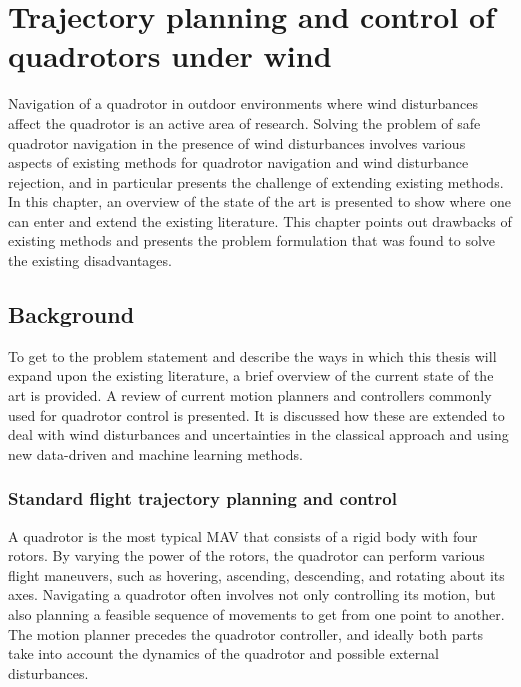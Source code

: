 \chapter{Trajectory planning and control of quadrotors under wind}

Navigation of a quadrotor in outdoor environments where wind disturbances affect the quadrotor is an active area of research. Solving the problem of safe quadrotor navigation in the presence of wind disturbances involves various aspects of existing methods for quadrotor navigation and wind disturbance rejection, and in particular presents the challenge of extending existing methods. In this chapter, an overview of the state of the art is presented to show where one can enter and extend the existing literature. This chapter points out drawbacks of existing methods and presents the problem formulation that was found to solve the existing disadvantages.

\section{Background}

To get to the problem statement and describe the ways in which this thesis will expand upon the existing literature, a brief overview of the current state of the art is provided. A review of current motion planners and controllers commonly used for quadrotor control is presented. It is discussed how these are extended to deal with wind disturbances and uncertainties in the classical approach and using new data-driven and machine learning methods. 
 
\subsection{Standard flight trajectory planning and control}

A quadrotor is the most typical MAV that consists of a rigid body with four rotors. By varying the power of the rotors, the quadrotor can perform various flight maneuvers, such as hovering, ascending, descending, and rotating about its axes. Navigating a quadrotor often involves not only controlling its motion, but also planning a feasible sequence of movements to get from one point to another. The motion planner precedes the quadrotor controller, and ideally both parts take into account the dynamics of the quadrotor and possible external disturbances. 

